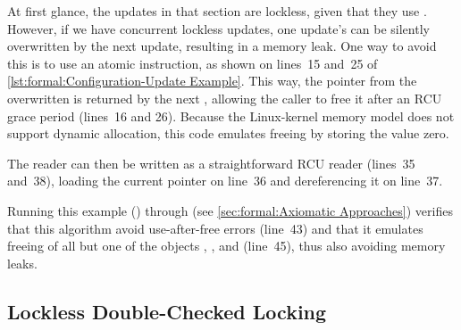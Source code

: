 At first glance, the updates in that section are lockless, given that
they use .
However, if we have concurrent lockless updates, one update's
 can be silently overwritten by the next update,
resulting in a memory leak.
One way to avoid this is to use an atomic  instruction,
as shown on lines~15 and~25 of
\cref{lst:formal:Configuration-Update Example}.
This way, the pointer from the overwritten  is returned by
the next , allowing the caller to free it after an RCU
grace period (lines~16 and 26).
Because the Linux-kernel memory model does not support dynamic allocation,
this code emulates freeing by storing the value zero.

\QuickQuizEnd

The reader can then be written as a straightforward RCU reader
(lines~35 and~38), loading the current pointer on line~36 and
dereferencing it on line~37.

Running this example
()
through 
(see \cref{sec:formal:Axiomatic Approaches})
verifies that this algorithm avoid use-after-free errors (line~43) and that it
emulates freeing of all but one of the objects , , and 
(line~45), thus also avoiding memory leaks.

\subsection{Lockless Double-Checked Locking}

\label{sec:together:Lockless Double-Checked Locking}

